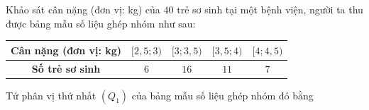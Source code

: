 \begin{ex}
Khảo sát cân nặng (đơn vị: kg) của $40$ trẻ sơ sinh tại một bệnh viện, người ta thu được bảng mẫu số liệu ghép nhóm như sau:
\begin{center}
\begin{tabular}{|c|c|c|c|c|}
\hline
\textbf{Cân nặng (đơn vị: kg)} & $[2{,}5;3)$ & $[3;3{,}5)$ & $[3{,}5;4)$ & $[4;4{,}5)$\\\hline
\textbf{Số trẻ sơ sinh} & $6$ & $16$ & $11$ & $7$\\\hline
\end{tabular}
\end{center}
Tứ phân vị thứ nhất $(Q_1)$ của bảng mẫu số liệu ghép nhóm đó bằng
\loigiai{$\dfrac n4=10$; tần số tích lũy: $6;\,22;\dots$ nên nhóm chứa $Q_1$ là $[3;3{,}5)$.
$Q_1=3+\dfrac{10-6}{16}\cdot0{,}5=3{,}125$.}
\end{ex}
